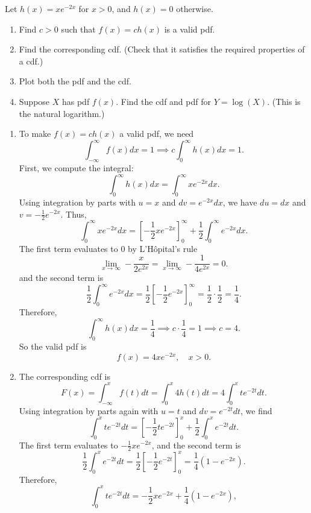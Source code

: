 \documentclass[12pt]{article}
\newenvironment{problem}[2][Problem]{\begin{trivlist}
\item[\hskip \labelsep {\bfseries #1}\hskip \labelsep {\bfseries #2.}]}
{\end{trivlist}}
\begin{document}
\begin{problem}{8}
  Let $h(x) = xe^{-2x}$ for $x > 0$, and $h(x) = 0$ otherwise.
  \begin{enumerate}
    \item Find $c > 0$ such that $f (x) = ch(x)$ is a valid pdf.
    \item Find the corresponding cdf. (Check that it satisfies the 
    required properties of a cdf.)
    \item Plot both the pdf and the cdf.
    \item Suppose $X$ has pdf $f (x)$. Find the cdf and pdf for 
    $Y = \log(X)$. (This is the natural logarithm.)
  \end{enumerate}

  \begin{enumerate}
    \item To make $f(x) = ch(x)$ a valid pdf, we need
    \[
      \int_{-\infty}^\infty f(x) dx = 1 \implies c \int_0^\infty h(x) dx = 1.
    \]
    First, we compute the integral:
    \[
      \int_0^\infty h(x) dx = \int_0^\infty xe^{-2x} dx.
    \]
    Using integration by parts with $u = x$ and $dv = e^{-2x} dx$, 
    we have $du = dx$ and $v = -\frac{1}{2} e^{-2x}$. Thus,
    \[
      \int_0^\infty xe^{-2x} dx 
      = \left[-\frac{1}{2}xe^{-2x}\right]_0^\infty 
      + \frac{1}{2}\int_0^\infty e^{-2x} dx.
    \]
    The first term evaluates to $0$ by L'Hôpital's rule 
    \[
      \lim_{x \to \infty} -\frac{x}{2e^{2x}} 
      = \lim_{x \to \infty} -\frac{1}{4e^{2x}} = 0. 
    \]
    and the second term is
    \[
      \frac{1}{2}\int_0^\infty e^{-2x} dx
      = \frac{1}{2}\left[-\frac{1}{2}e^{-2x}\right]_0^\infty
      = \frac{1}{2} \cdot \frac{1}{2} = \frac{1}{4}.
    \]
    Therefore,
    \[
      \int_0^\infty h(x) dx 
      = \frac{1}{4} \implies c \cdot \frac{1}{4} = 1 \implies c = 4.
    \]
    So the valid pdf is
    \[
      f(x) = 4xe^{-2x}, \quad x > 0.
    \]
    \item The corresponding cdf is
    \[
      F(x) = \int_{-\infty}^x f(t) dt = \int_0^x 4h(t) dt = 4\int_0^x te^{-2t} dt.
    \]
    Using integration by parts again with $u = t$ and $dv = e^{-2t} dt$, we find
    \[
      \int_0^x te^{-2t} dt = \left[-\frac{1}{2}te^{-2t}\right]_0^x + \frac{1}{2}\int_0^x e^{-2t} dt.
    \]
    The first term evaluates to $-\frac{1}{2}xe^{-2x}$, and the second term is
    \[
      \frac{1}{2}\int_0^x e^{-2t} dt = \frac{1}{2}\left[-\frac{1}{2}e^{-2t}\right]_0^x = \frac{1}{4}(1 - e^{-2x}).
    \]
    Therefore,
    \[
      \int_0^x te^{-2t} dt = -\frac{1}{2}xe^{-2x} + \frac{1}{4}(1 - e^{-2x}),
\]
\end{enumerate}
\end{problem}
\end{document}
